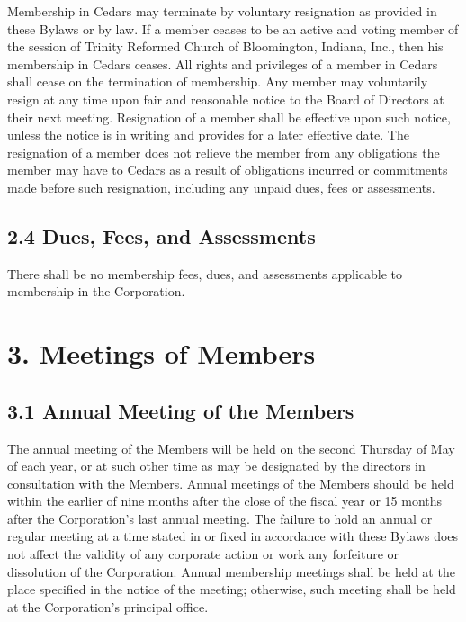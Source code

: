 \documentclass[
]{book}
\begin{document}
Membership in Cedars may terminate by voluntary resignation as provided in these Bylaws or by law. If a member ceases to be an active and voting member of the session of Trinity Reformed Church of Bloomington, Indiana, Inc., then his membership in Cedars ceases. All rights and privileges of a member in Cedars shall cease on the termination of membership. Any member may voluntarily resign at any time upon fair and reasonable notice to the Board of Directors at their next meeting. Resignation of a member shall be effective upon such notice, unless the notice is in writing and provides for a later effective date. The resignation of a member does not relieve the member from any obligations the member may have to Cedars as a result of obligations incurred or commitments made before such resignation, including any unpaid dues, fees or assessments.

\subsection*{2.4 Dues, Fees, and Assessments}\label{dues-fees-and-assessments}

There shall be no membership fees, dues, and assessments applicable to membership in the Corporation.

\section*{3. Meetings of Members}\label{meetings-of-members}

\subsection*{3.1 Annual Meeting of the Members}\label{annual-meeting-of-the-members}

The annual meeting of the Members will be held on the second Thursday of May of each year, or at such other time as may be designated by the directors in consultation with the Members. Annual meetings of the Members should be held within the earlier of nine months after the close of the fiscal year or 15 months after the Corporation's last annual meeting. The failure to hold an annual or regular meeting at a time stated in or fixed in accordance with these Bylaws does not affect the validity of any corporate action or work any forfeiture or dissolution of the Corporation. Annual membership meetings shall be held at the place specified in the notice of the meeting; otherwise, such meeting shall be held at the Corporation's principal office.
\end{document}

